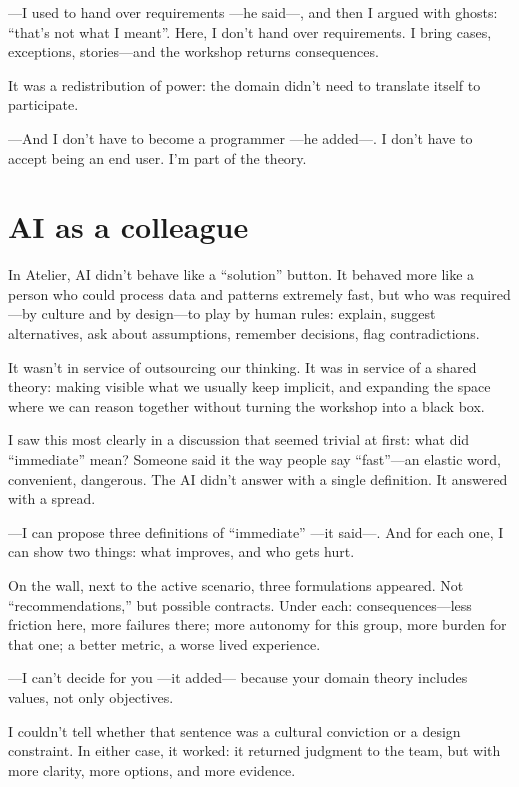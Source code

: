 \documentclass[11pt,a4paper]{article}
\begin{document}
---I used to hand over requirements ---he said---, and then I argued with
ghosts: ``that's not what I meant''. Here, I don't hand over requirements. I
bring cases, exceptions, stories---and the workshop returns consequences.

It was a redistribution of power: the domain didn't need to translate itself
to participate.

---And I don't have to become a programmer ---he added---. I don't have to
accept being an end user. I'm part of the theory.

\section{AI as a colleague}

In Atelier, AI didn't behave like a ``solution'' button. It behaved more like
a person who could process data and patterns extremely fast, but who was
required---by culture and by design---to play by human rules: explain,
suggest alternatives, ask about assumptions, remember decisions, flag
contradictions.

It wasn't in service of outsourcing our thinking. It was in service of a
shared theory: making visible what we usually keep implicit, and expanding
the space where we can reason together without turning the workshop into a
black box.

I saw this most clearly in a discussion that seemed trivial at first: what
did ``immediate'' mean? Someone said it the way people say ``fast''---an
elastic word, convenient, dangerous. The AI didn't answer with a single
definition. It answered with a spread.

---I can propose three definitions of ``immediate'' ---it said---. And for
each one, I can show two things: what improves, and who gets hurt.

On the wall, next to the active scenario, three formulations appeared. Not
``recommendations,'' but possible contracts. Under each:
consequences---less friction here, more failures there; more autonomy for
this group, more burden for that one; a better metric, a worse lived
experience.

---I can't decide for you ---it added--- because your domain theory includes
values, not only objectives.

I couldn't tell whether that sentence was a cultural conviction or a design
constraint. In either case, it worked: it returned judgment to the team, but
with more clarity, more options, and more evidence.
\end{document}
